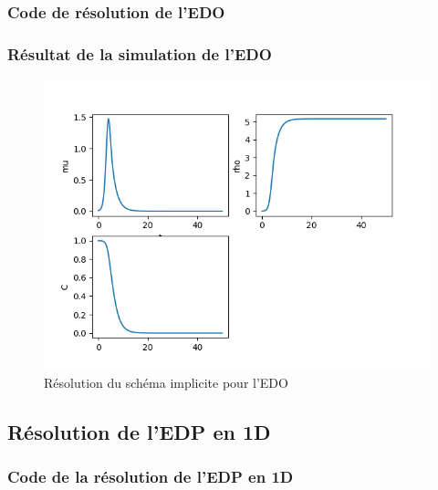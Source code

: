 \documentclass[11pt]{article}
\begin{document}
\subsubsection{Code de résolution de l'EDO}

\subsubsection{Résultat de la simulation de l'EDO}
\begin{figure}[hbt!]
\centering
\includegraphics[width=.9\textwidth]{edo_euler_implicite.png}
\caption{Résolution du schéma implicite pour l'EDO}
\end{figure}

\newpage
\subsection{Résolution de l'EDP en 1D}
\subsubsection{Code de la résolution de l'EDP en 1D}

\newpage
\end{document}
